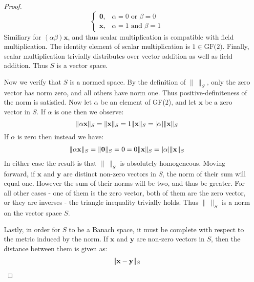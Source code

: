 \documentclass{article}
\theoremstyle{plain}
\DeclarePairedDelimiter\norm{\lVert}{\rVert}
\begin{document}
\begin{proof}
\begin{equation}
\begin{cases}
                    \mathbf{0},&\alpha=0\textrm{ or }\beta=0\\
                    \mathbf{x},&\alpha=1\textrm{ and }\beta=1
                \end{cases}
        \end{equation}
        Similiary for $(\alpha\beta)\mathbf{x}$, and thus
        scalar multiplication is compatible with field multiplication. The identity
        element of scalar multiplication is $1\in \text{GF(2)}$. Finally, scalar
        multiplication trivially distributes over vector addition as well as field
        addition. Thus $S$ is a vector space.
        \par\hfill\par
        Now we verify that $S$ is a normed space. By the definition of $\| \,\|_S$, only
        the zero vector has norm zero, and all others have norm one. Thus
        positive-definiteness of the norm is satisfied. Now let $\alpha$ be
        an element of GF(2), and let $\mathbf{x}$ be a zero vector
        in $S$. If $\alpha$ is one then we observe:
        \begin{equation}
            \norm{\alpha\mathbf{x}}_{S}=\norm{\mathbf{x}}_{S}
                =1\norm{\mathbf{x}}_{S}
                =|\alpha|\norm{\mathbf{x}}_{S}
        \end{equation}
        If $\alpha$ is zero then instead we have:
        \begin{align*}
            \norm{\alpha\mathbf{x}}_{S}=\norm{\mathbf{0}}_{S}
                =0=0\norm{\mathbf{x}}_{S}
                =|\alpha|\norm{\mathbf{x}}_{S}
        \end{align*}
        In either case the result is that $\|\,\|_S$ is absolutely homogeneous.
        Moving forward, if $\mathbf{x}$ and $\mathbf{y}$ are distinct non-zero vectors
        in $S$, the norm of their sum will equal one. However the sum of their norms will be
        two, and thus be greater. For all other cases - one of them is the zero vector, both
        of them are the zero vector, or they are inverses - the triangle inequality trivially
        holds. Thus $\|\,\|_S$ is a norm on the vector space $S$.
        \par
        Lastly, in order for $S$ to be a Banach space, it must be complete with
        respect to the metric induced by the norm. If $\mathbf{x}$ and $\mathbf{y}$
        are non-zero vectors in $S$, then the distance between them is given as:
        \begin{align*}
            \norm{\mathbf{x}-\mathbf{y}}_{S}

\end{align*}
\end{proof}
\end{document}
